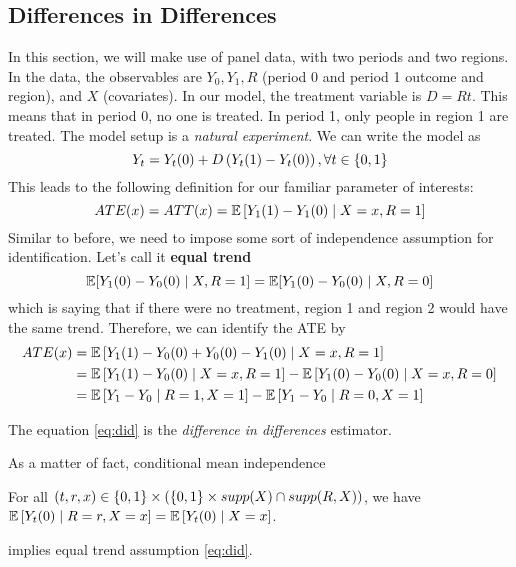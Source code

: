 \subsection{Differences in Differences}
In this section, we will make use of panel data, with two periods and two
regions. In the data, the observables are $Y_0,Y_1, R$ (period 0 and period 1
outcome and region), and $X$ (covariates). In our model, the treatment variable
is $D=Rt$. This means that in period 0, no one is treated. In period 1, only
people in region 1 are treated. The model setup is a \emph{natural experiment}.
We can write the model as
\begin{equation*}
    Y_t=Y_t(0)+D\left(Y_t(1)-Y_t(0)\right), \forall t\in\{0,1\}
\end{equation*}
This leads to the following definition for our familiar parameter of interests:
\begin{equation*}
    ATE(x)=ATT(x)=\mathbb{E}\left[Y_1(1)-Y_1(0)\mid X=x,R=1\right]
\end{equation*}
Similar to before, we need to impose some sort of independence assumption for identification. Let's call it \textbf{equal trend}
\begin{equation*}\label{eq:equal_trend}
    \mathbb{E}[Y_1(0)-Y_0(0)\mid X,R=1]=\mathbb{E}[Y_1(0)-Y_0(0)\mid X,R=0]
\end{equation*}
which is saying that if there were no treatment, region 1 and region 2 would have the same trend.
Therefore, we can identify the ATE by
\begin{equation} \label{eq:did}
    \begin{split}
        ATE(x)&=\mathbb{E}\left[Y_1(1)-Y_0(0)+Y_0(0)-Y_1(0)\mid X=x,R=1\right] \\
        &= \mathbb{E}\left[Y_1(1)-Y_0(0)\mid X=x,R=1\right]-\mathbb{E}\left[Y_1(0)-Y_0(0)\mid X=x,R=0\right] \\
        &= \mathbb{E}\left[Y_1-Y_0\mid R=1,X=1\right]-\mathbb{E}\left[Y_1-Y_0\mid R=0,X=1\right]
    \end{split}
\end{equation}

The equation \ref{eq:did} is the \emph{difference in differences} estimator.

As a matter of fact, conditional mean independence \begin{assumption}For all $(t,r,x) \in \left\{0,1\right\}\times \left(\left\{0,1\right\}\times supp(X) \cap supp(R,X)\right)$, we have $\mathbb{E}\left[Y_t(0) \mid R=r,X=x\right]=\mathbb{E}\left[Y_t(0) \mid X=x\right]$.
\end{assumption}implies equal trend assumption \eqref{eq:did}.

